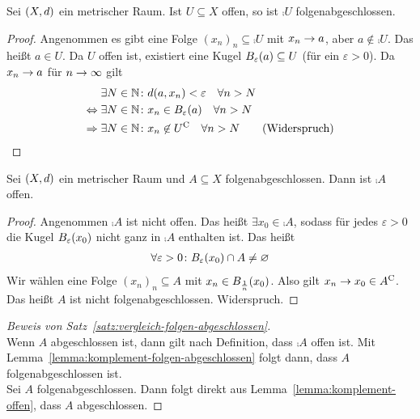 \begin{lemma} %
    \label{lemma:komplement-folgen-abgeschlossen}
    Sei $\left(X, d\right)$ ein metrischer Raum. Ist $U\subseteq X$ offen, so ist $\comp{U}$ folgenabgeschlossen.

    \begin{proof}
        Angenommen es gibt eine Folge $(x_n)_n \subseteq \comp{U}$ mit $x_n\rightarrow{} a$, aber $a\not\in \comp{U}$. Das heißt $a\in U$. Da $U$ offen ist, existiert eine Kugel $B_{\varepsilon}\of{a} \subseteq U$ (für ein $\varepsilon > 0$). Da $x_n\rightarrow{} a$ für $n\rightarrow{}\infty$ gilt
        \begin{align*}
            \exists N\in\N\colon &d\of{a, x_n} < \varepsilon\quad\forall n> N \\
            \equivalent \exists N\in\N\colon &x_n \in B_{\varepsilon}\of{a}\quad\forall n > N\\
            \impl \exists N\in\N\colon &x_n\not\in \comp{U}\quad\forall n > N\tag*{(Widerspruch)\qedhere}
        \end{align*}
    \end{proof}
\end{lemma}

\begin{lemma}
    \label{lemma:komplement-offen}
    Sei $\left(X, d\right)$ ein metrischer Raum und $A\subseteq X$ folgenabgeschlossen. Dann ist $\comp{A}$ offen.

    \begin{proof}
        Angenommen $\comp{A}$ ist nicht offen. Das heißt $\exists x_0 \in \comp{A}$, sodass für jedes $\varepsilon > 0$ die Kugel $B_{\varepsilon}\of{x_0}$ nicht ganz in $\comp{A}$ enthalten ist. Das heißt
        \begin{align*}
            \forall\varepsilon > 0\colon B_{\varepsilon}\of{x_0}\cap A \neq \emptyset
        \end{align*}
        Wir wählen eine Folge $(x_n)_n\subseteq A$ mit $x_n\in B_{\frac{1}{n}}\of{x_0}$. Also gilt $x_n\rightarrow{} x_0\in {A}^{\mathrm{C}}$. Das heißt $A$ ist nicht folgenabgeschlossen. Widerspruch.
    \end{proof}
\end{lemma}

\begin{proof}[Beweis von Satz~\ref{satz:vergleich-folgen-abgeschlossen}]
    ~\\
    \anf{$\impl$} Wenn $A$ abgeschlossen ist, dann gilt nach Definition, dass $\comp{A}$ offen ist. Mit Lemma~\ref{lemma:komplement-folgen-abgeschlossen} folgt dann, dass $A$ folgenabgeschlossen ist.\\
    \anf{$\Leftarrow$} Sei $A$ folgenabgeschlossen. Dann folgt direkt aus Lemma~\ref{lemma:komplement-offen}, dass $A$ abgeschlossen.
\end{proof}

